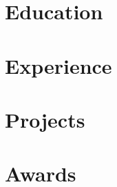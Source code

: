 \documentclass{cv}
\begin{document}

    \section{Education}
        

    \section{Experience}
        
        


    \begin{multicols}{2}
        \section{Projects}
        
        \section{Awards}
    \end{multicols}
\end{document}
